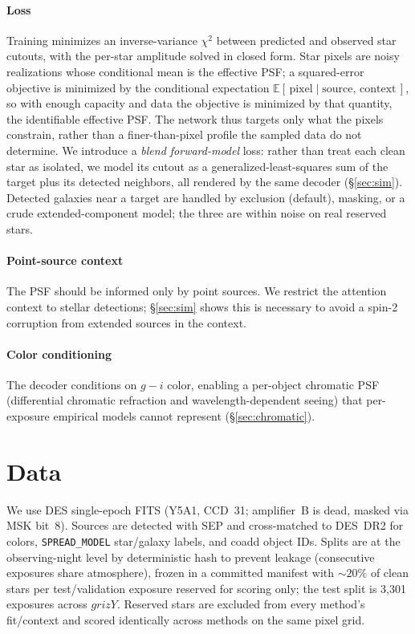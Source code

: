 \documentclass[twocolumn]{aastex701}
\begin{document}
\paragraph{Loss} Training minimizes an inverse-variance $\chi^2$ between predicted and
observed star cutouts, with the per-star amplitude solved in closed form. Star pixels are
noisy realizations whose conditional mean is the effective PSF; a squared-error objective
is minimized by the conditional expectation $\mathbb{E}[\,\text{pixel}\mid\text{source,
context}\,]$, so with enough capacity and data the objective is minimized by that
quantity, the identifiable effective PSF. The network thus targets only what the pixels
constrain, rather than a finer-than-pixel profile the sampled data do not determine. We
introduce a
\emph{blend forward-model} loss: rather than treat each clean star as isolated, we model
its cutout as a generalized-least-squares sum of the target plus its detected neighbors,
all rendered by the same decoder (\S\ref{sec:sim}). Detected galaxies near a target are
handled by exclusion (default), masking, or a crude extended-component model; the three
are within noise on real reserved stars.

\paragraph{Point-source context} The PSF should be informed only by point sources. We
restrict the attention context to stellar detections; \S\ref{sec:sim} shows this is
necessary to avoid a spin-2 corruption from extended sources in the context.

\paragraph{Color conditioning} The decoder conditions on $g{-}i$ color, enabling a
per-object chromatic PSF (differential chromatic refraction and wavelength-dependent
seeing) that per-exposure empirical models cannot represent (\S\ref{sec:chromatic}).


\section{Data} \label{sec:data}

We use DES single-epoch FITS (Y5A1, CCD~31; amplifier~B is dead, masked via MSK bit~8).
Sources are detected with \textsc{SEP} and cross-matched to DES~DR2 for colors,
\texttt{SPREAD\_MODEL} star/galaxy labels, and coadd object IDs. Splits are at the
observing-night level by deterministic hash to prevent leakage (consecutive exposures
share atmosphere), frozen in a committed manifest with ${\sim}20\%$ of clean stars per
test/validation exposure reserved for scoring only; the test split is 3{,}301 exposures
across $grizY$. Reserved stars are excluded from every method's fit/context and scored
identically across methods on the same pixel grid.
\end{document}
